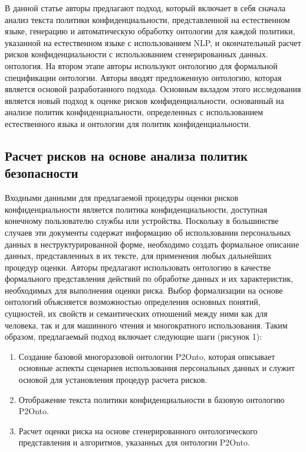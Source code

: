 \documentclass[../main]{subfiles}
\begin{document}
В данной статье авторы предлагают подход, который включает в себя сначала анализ текста политики конфиденциальности, представленной на естественном языке, генерацию и автоматическую обработку онтологии для каждой политики, указанной на естественном языке с использованием NLP, и окончательный расчет рисков конфиденциальности с использованием сгенерированных данных. онтология. На втором этапе авторы используют онтологию для формальной спецификации онтологии. Авторы вводят предложенную онтологию, которая является основой разработанного подхода.
Основным вкладом этого исследования является новый подход к оценке рисков конфиденциальности, основанный на анализе политик конфиденциальности, определенных с использованием естественного языка и онтологии для политик конфиденциальности. 

\subsection{Расчет рисков на основе анализа политик безопасности}

Входными данными для предлагаемой процедуры оценки рисков конфиденциальности является политика конфиденциальности, доступная конечному пользователю службы или устройства. Поскольку в большинстве случаев эти документы содержат информацию об использовании персональных данных в неструктурированной форме, необходимо создать формальное описание данных, представленных в их тексте, для применения любых дальнейших процедур оценки. Авторы предлагают использовать онтологию в качестве формального представления действий по обработке данных и их характеристик, необходимых для выполнения оценки риска. Выбор формализации на основе онтологий объясняется возможностью определения основных понятий, сущностей, их свойств и семантических отношений между ними как для человека, так и для машинного чтения и многократного использования. Таким образом, предлагаемый подход включает следующие шаги (рисунок 1): 
\begin{enumerate}
    \item Создание базовой многоразовой онтологии P2Onto, которая описывает основные аспекты сценариев использования персональных данных и служит основой для установления процедур расчета рисков. 
    \item Отображение текста политики конфиденциальности в базовую онтологию P2Onto. 
    \item Расчет оценки риска на основе сгенерированного онтологического представления и алгоритмов, указанных для онтологии P2Onto.
\end{enumerate}
\end{document}

